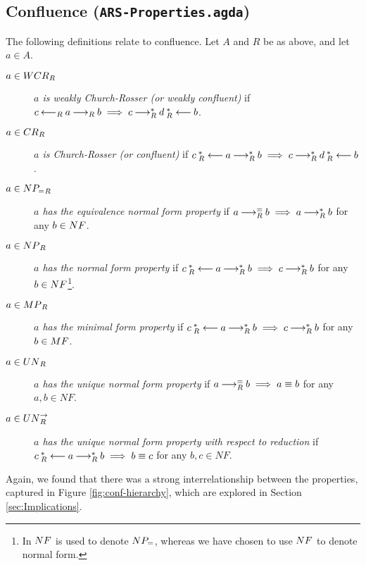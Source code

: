 \subsection{Confluence (\texttt{ARS-Properties.agda})}
\begin{definition} The following definitions relate to confluence. Let $A$ and $R$ be as above, and let $a \in A$.
    \begin{description}
        \item[$a \in \WCR_R$] \emph{$a$ is weakly Church-Rosser (or weakly confluent)} if $c \mathbin{\longleftarrow_R} a \mathbin{\longrightarrow_R} b \implies c \mathbin{\longrightarrow_R^*} d \mathbin{_R^*\longleftarrow} b$.
        \item[$a \in \CR_R$] \emph{$a$ is Church-Rosser (or confluent)} if $c \mathbin{_R^*\longleftarrow} a \mathbin{\longrightarrow_R^*} b \implies c \mathbin{\longrightarrow_R^*} d \mathbin{_R^*\longleftarrow} b$.
        \item[$a \in \NPe_R$] \emph{$a$ has the equivalence normal form property} if $a \mathbin{\longrightarrow_R^=} b \implies a\mathbin{\longrightarrow_R^*} b$ for any $b \in \NF$.
        \item[$a \in \NP_R$] \emph{$a$ has the normal form property} if $c \mathbin{_R^*\longleftarrow} a \mathbin{\longrightarrow_R^*} b \implies c \mathbin{\longrightarrow_R^*} b$ for any $b \in \NF$\footnote{In \terese $\NF$ is used to denote $\NPe$, whereas we have chosen to use $\NF$ to denote normal form.}. 
        \item[$a \in \MP_R$] \emph{$a$ has the minimal form property} if $c \mathbin{_R^*\longleftarrow} a \mathbin{\longrightarrow_R^*} b \implies c \mathbin{\longrightarrow_R^*} b$ for any $b \in \MF$.
        \item[$a \in \UN_R$] \emph{$a$ has the unique normal form property} if $a \mathbin{\longrightarrow_R^=} b \implies a \equiv b$  for any $a, b \in NF$.
        \item[$a \in \UNto_R$] \emph{$a$ has the unique normal form property with respect to reduction} if $c \mathbin{_R^*\longleftarrow} a \mathbin{\longrightarrow_R^*} b  \implies b \equiv c$  for any $b, c \in NF$.
    \end{description}
\end{definition}

Again, we found that there was a strong interrelationship between the properties, captured in Figure \ref{fig:conf-hierarchy}, which are explored in Section \ref{sec:Implications}.

